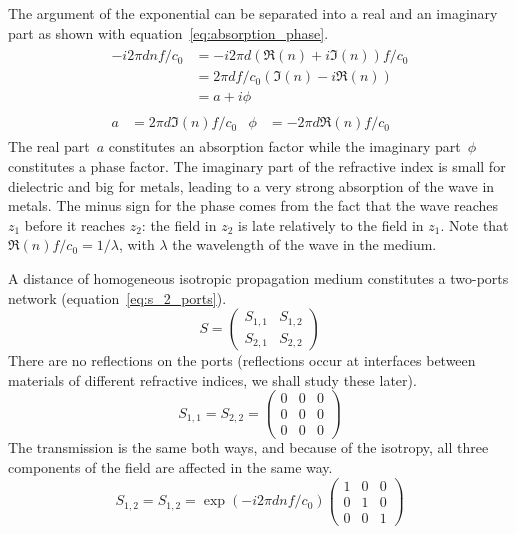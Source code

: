 The argument of the exponential can be separated into a real and an imaginary part as shown with equation~\eqref{eq:absorption_phase}.
\begin{gather}
    \begin{aligned}
        - i 2\pi d n f / c_0
        &= - i 2\pi d \left(\Re(n) + i\Im(n)\right) f / c_0 \\
        &= 2\pi d f / c_0 \left(\Im(n) - i\Re(n) \right) \\
        &= a + i \phi
    \end{aligned}
    \label{eq:absorption_phase}
    \\
    \begin{aligned}
        a &= 2\pi d \Im(n) f / c_0   &   \phi &= -2\pi d \Re(n) f / c_0
    \end{aligned}
\end{gather}
The real part~$a$ constitutes an absorption factor while the imaginary part~$\phi$ constitutes a phase factor.
The imaginary part of the refractive index is small for dielectric and big for metals,
leading to a very strong absorption of the wave in metals.
The minus sign for the phase comes from the fact that the wave reaches $z_1$ before it reaches $z_2$: the field in $z_2$ is late relatively to the field in $z_1$.
Note that $\Re(n) f / c_0 = 1 / \lambda$, with $\lambda$ the wavelength of the wave in the medium.

A distance of homogeneous isotropic propagation medium constitutes a two-ports network (equation~\eqref{eq:s_2_ports}).
\begin{equation}
    S =
    \begin{pmatrix}
        S_{1, 1} & S_{1, 2} \\
        S_{2, 1} & S_{2, 2}
    \end{pmatrix}
    \label{eq:s_2_ports}
\end{equation}
There are no reflections on the ports (reflections occur at interfaces between materials of different refractive indices, we shall study these later).
\begin{equation}
    S_{1, 1} = S_{2, 2} =
    \begin{pmatrix}
        0 & 0 & 0 \\
        0 & 0 & 0 \\
        0 & 0 & 0
    \end{pmatrix}
\end{equation}
The transmission is the same both ways, and because of the isotropy, all three components of the field are affected in the same way.
\begin{equation}
    S_{1, 2} = S_{1, 2} =
    \exp(- i 2\pi d n f / c_0)
    \begin{pmatrix}
        1 & 0 & 0 \\
        0 & 1 & 0 \\
        0 & 0 & 1
    \end{pmatrix}
\end{equation}


